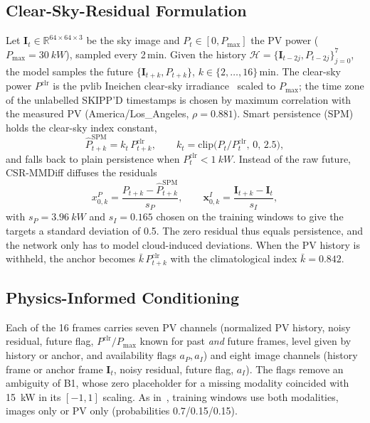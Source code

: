 \documentclass[conference]{IEEEtran}
\newcommand{\Pclr}{P^{\mathrm{clr}}}
\newcommand{\Pspm}{\hat P^{\mathrm{SPM}}}
\newcommand{\BOne}{B1}
\begin{document}
\subsection{Clear-Sky-Residual Formulation}
Let $\mathbf I_t\in\mathbb R^{64\times64\times3}$ be the sky image and $P_t\in[0,P_{\max}]$ the PV power ($P_{\max}=\SI{30}{kW}$), sampled every 2\,min. Given the history $\mathcal H=\{\mathbf I_{t-2j},P_{t-2j}\}_{j=0}^{7}$, the model samples the future $\{\mathbf I_{t+k},P_{t+k}\}$, $k\in\{2,\dots,16\}$\,min. The clear-sky power $\Pclr$ is the pvlib Ineichen clear-sky irradiance~\cite{holmgren2018pvlib} scaled to $P_{\max}$; the time zone of the unlabelled SKIPP'D timestamps is chosen by maximum correlation with the measured PV (America/Los\_Angeles, $\rho=0.881$). Smart persistence (SPM) holds the clear-sky index constant,
\begin{equation}
\Pspm_{t+k}=k_t\,\Pclr_{t+k},\qquad k_t=\mathrm{clip}\big(P_t/\Pclr_t,\,0,\,2.5\big),
\end{equation}
and falls back to plain persistence when $\Pclr_t<\SI{1}{kW}$. Instead of the raw future, CSR-MMDiff diffuses the residuals
\begin{equation}
x^P_{0,k}=\frac{P_{t+k}-\Pspm_{t+k}}{s_P},\qquad \mathbf x^I_{0,k}=\frac{\mathbf I_{t+k}-\mathbf I_t}{s_I},
\label{eq:res}
\end{equation}
with $s_P=\SI{3.96}{kW}$ and $s_I=0.165$ chosen on the training windows to give the targets a standard deviation of 0.5. The zero residual thus equals persistence, and the network only has to model cloud-induced deviations. When the PV history is withheld, the anchor becomes $\bar k\,\Pclr_{t+k}$ with the climatological index $\bar k=0.842$.

\subsection{Physics-Informed Conditioning}
Each of the 16 frames carries seven PV channels (normalized PV history, noisy residual, future flag, $\Pclr/P_{\max}$ known for past \emph{and} future frames, level given by history or anchor, and availability flags $a_P,a_I$) and eight image channels (history frame or anchor frame $\mathbf I_t$, noisy residual, future flag, $a_I$). The flags remove an ambiguity of \BOne, whose zero placeholder for a missing modality coincided with \SI{15}{kW} in its $[-1,1]$ scaling. As in~\cite{huang2026pvmm}, training windows use both modalities, images only or PV only (probabilities 0.7/0.15/0.15).
\end{document}
